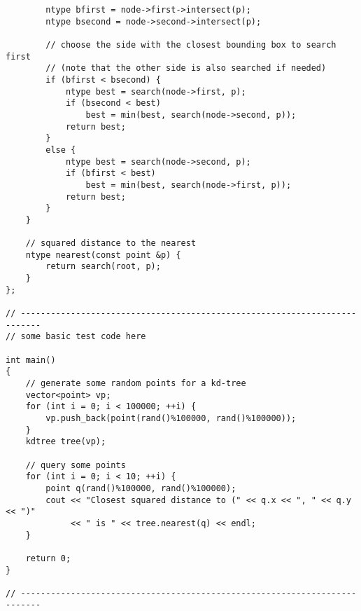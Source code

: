 \begin{lstlisting}
        ntype bfirst = node->first->intersect(p);
        ntype bsecond = node->second->intersect(p);
        
        // choose the side with the closest bounding box to search first
        // (note that the other side is also searched if needed)
        if (bfirst < bsecond) {
            ntype best = search(node->first, p);
            if (bsecond < best)
                best = min(best, search(node->second, p));
            return best;
        }
        else {
            ntype best = search(node->second, p);
            if (bfirst < best)
                best = min(best, search(node->first, p));
            return best;
        }
    }
    
    // squared distance to the nearest 
    ntype nearest(const point &p) {
        return search(root, p);
    }
};

// --------------------------------------------------------------------------
// some basic test code here

int main()
{
    // generate some random points for a kd-tree
    vector<point> vp;
    for (int i = 0; i < 100000; ++i) {
        vp.push_back(point(rand()%100000, rand()%100000));
    }
    kdtree tree(vp);
    
    // query some points
    for (int i = 0; i < 10; ++i) {
        point q(rand()%100000, rand()%100000);
        cout << "Closest squared distance to (" << q.x << ", " << q.y << ")"
             << " is " << tree.nearest(q) << endl;
    }    

    return 0;
}

// --------------------------------------------------------------------------

\end{lstlisting}